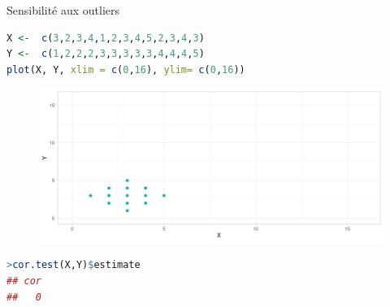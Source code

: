 \documentclass{beamer}
\begin{document}
\begin{frame}[fragile]{Sensibilité aux outliers}



\begin{tiny}
\begin{spacing}{0.75}
\begin{lstlisting}[language=R,basicstyle=\scriptsize\ttfamily, commentstyle=\ttfamily]
X <-  c(3,2,3,4,1,2,3,4,5,2,3,4,3)
Y <-  c(1,2,2,2,3,3,3,3,3,4,4,4,5)
plot(X, Y, xlim = c(0,16), ylim= c(0,16))
\end{lstlisting}
\end{spacing}
\end{tiny}




\begin{figure}
\includegraphics[width=.9\linewidth]{img/outlier1.png}
\end{figure}



\begin{tiny}
\begin{spacing}{0.75}
\begin{lstlisting}[language=R,basicstyle=\scriptsize\ttfamily, commentstyle=\ttfamily]
>cor.test(X,Y)$estimate
## cor 
##   0
\end{lstlisting}
\end{spacing}
\end{tiny}

\end{frame}
\end{document}
